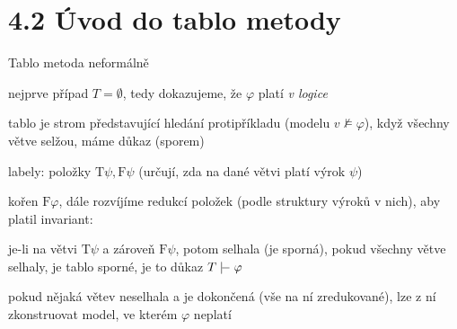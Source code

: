 \documentclass{beamer}
\begin{document}
\section{4.2 Úvod do tablo metody}


\begin{frame}{Tablo metoda neformálně}

    nejprve případ $T=\emptyset$, tedy dokazujeme, že $\varphi$ platí \emph{v logice}

    \alert{tablo} je strom představující \alert{hledání protipříkladu} (modelu $v\not\models\varphi$), když všechny větve \alert{selžou}, máme důkaz (sporem)

    labely: \alert{položky} $\mathrm{T}\psi,\mathrm{F}\psi$ (určují, zda na dané větvi platí výrok $\psi$)

    kořen \alert{$\mathrm{F}\varphi$}, dále rozvíjíme \alert{redukcí} položek (podle struktury výroků v nich), aby platil \alert{invariant}:


    je-li na větvi \alert{$\mathrm{T}\psi$} a zároveň \alert{$\mathrm{F}\psi$}, potom \alert{selhala} (je \alert{sporná}), pokud všechny větve selhaly, je tablo \alert{sporné}, je to \alert{důkaz} $T\proves\varphi$

    pokud nějaká větev neselhala a je \alert{dokončená} (vše na ní zredukované), lze z ní zkonstruovat model, ve kterém $\varphi$ neplatí

\end{frame}
\end{document}
